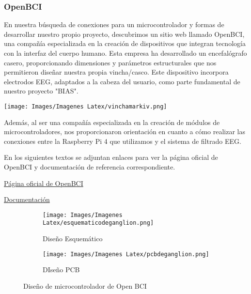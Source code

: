 \documentclass{article}
\begin{document}
\subsubsection{OpenBCI}

En nuestra búsqueda de conexiones para un microcontrolador y formas de desarrollar nuestro propio proyecto, descubrimos un sitio web llamado OpenBCI, una compañía especializada en la creación de dispositivos que integran tecnología con la interfaz del cuerpo humano. Esta empresa ha desarrollado un encefalógrafo casero, proporcionando dimensiones y parámetros estructurales que nos permitieron diseñar nuestra propia vincha/casco. Este dispositivo incorpora electrodos EEG, adaptados a la cabeza del usuario, como parte fundamental de nuestro proyecto "BIAS".

\begin{center}
    \texttt{[image: Images/Imagenes Latex/vinchamarkiv.png]}\\
\end{center}

Además, al ser una compañía especializada en la creación de módulos de microcontroladores, nos proporcionaron orientación en cuanto a cómo realizar las conexiones entre la Raspberry Pi 4 que utilizamos y el sistema de filtrado EEG.

En los siguientes textos se adjuntan enlaces para ver la página oficial de OpenBCI y documentación de referencia correspondiente.

\begin{center}
    \href{https://openbci.com/}{Página oficial de OpenBCI}

    
    \href{https://docs.openbci.com/}{Documentación}

    
\end{center}

\begin{figure}[h!]
\centering

\begin{subfigure}[b]{0.45\linewidth}
\texttt{[image: Images/Imagenes Latex/esquematicodeganglion.png]}
\caption{Diseño Esquemático}
\label{fig:westminster_lateral}
\end{subfigure}

\begin{subfigure}[b]{0.45\linewidth}
\texttt{[image: Images/Imagenes Latex/pcbdeganglion.png]}
\caption{DIseño PCB}
\label{fig:westminster_aerea}

\end{subfigure}
\caption{Diseño de microcontrolador de Open BCI}
\label{fig:westminster}
\end{figure}
\end{document}
